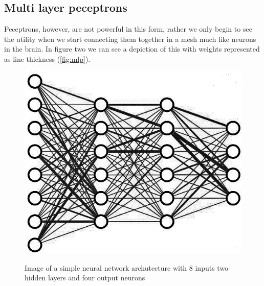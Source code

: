 \documentclass{article}
\begin{document}
\subsection{Multi layer peceptrons}
\label{sec:mlp}
Peceptrons, however, are not powerful in this form, rather we only begin to see the utility when we start connecting them together in a mesh much like neurons in the brain. In figure two we can see a depiction of this with weights represented as line thickness (\autoref{fig:mlp}).
\begin{figure}[H]
\caption{Image of a simple neural network archutecture with 8 inputs two hidden layers and four output neurons}
\label{fig:mlp}
\includegraphics[scale=2]{nn.jpg}
\cite{3blue1brown}
\end{figure}
\end{document}
